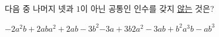 다음 중 나머지 넷과 $1$이 아닌 공통인 인수를 갖지 \underline{않는} 것은?
\begin{choicesii}{$-2a^2b+2ab$}{$a^2+2ab-3b^2$}{$-3a+3b$}{$2a^2-3ab+b^2$}{$a^3b-ab^3$}\end{choicesii}
